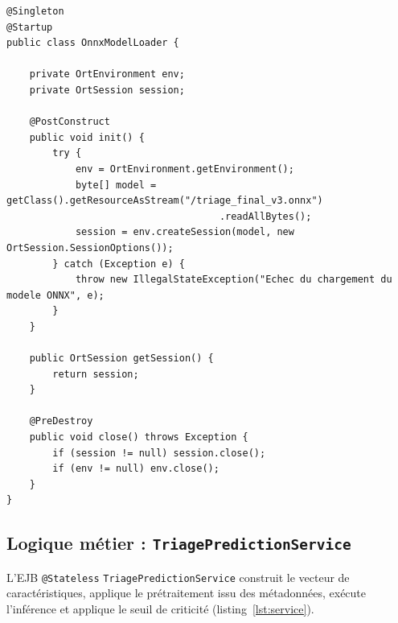 \begin{listing}[H]
\begin{verbatim}
@Singleton
@Startup
public class OnnxModelLoader {

    private OrtEnvironment env;
    private OrtSession session;

    @PostConstruct
    public void init() {
        try {
            env = OrtEnvironment.getEnvironment();
            byte[] model = getClass().getResourceAsStream("/triage_final_v3.onnx")
                                     .readAllBytes();
            session = env.createSession(model, new OrtSession.SessionOptions());
        } catch (Exception e) {
            throw new IllegalStateException("Echec du chargement du modele ONNX", e);
        }
    }

    public OrtSession getSession() {
        return session;
    }

    @PreDestroy
    public void close() throws Exception {
        if (session != null) session.close();
        if (env != null) env.close();
    }
}
\end{verbatim}
\caption{Chargement unique du modèle ONNX au démarrage (\texttt{OnnxModelLoader}).}
\label{lst:loader}
\end{listing}

\subsection{Logique métier : \texttt{TriagePredictionService}}
L'EJB \texttt{@Stateless} \texttt{TriagePredictionService} construit le vecteur de
caractéristiques, applique le prétraitement issu des métadonnées, exécute l'inférence et applique
le seuil de criticité (listing~\ref{lst:service}).

